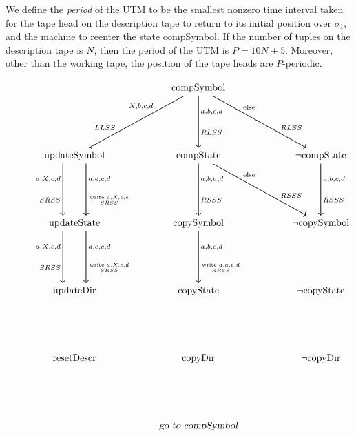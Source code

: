 \documentclass[english,letter paper,12pt,reqno]{article}
\theoremstyle{definition}
\begin{document}
We define the \textit{period} of the UTM to be the smallest nonzero time interval taken for the tape head on the description tape to return to its initial position over $\sigma_1$, and the machine to reenter the state compSymbol. If the number of tuples on the description tape is $N$, then the period of the UTM is $P = 10N+5$. Moreover, other than the working tape, the position of the tape heads are $P$-periodic.

\begin{figure}[htpb]
    \centering
\[
\begin{tikzcd}[row sep = large]
	&& {\text{compSymbol}} \\
	\\
	{\text{updateSymbol}} && {\text{compState}} && {\neg \text{compState}} \\
	\\
	{\text{updateState}} && {\text{copySymbol}} && {\neg\text{copySymbol}} \\
	\\
	{\text{updateDir}} && {\text{copyState}} && {\neg\text{copyState}} \\
	\\
	{\text{resetDescr}} && {\text{copyDir}} && {\neg\text{copyDir}} \\
	\\
	&& {\textsl{go to compSymbol}}
	\arrow["{X,b,c,d}"'{pos=0.3}, from=1-3, to=3-1]
	\arrow["LLSS"'{pos=0.7}, from=1-3, to=3-1]
	\arrow["{a,b,c,a}"{pos=0.3}, from=1-3, to=3-3]
	\arrow["RLSS"{pos=0.7}, from=1-3, to=3-3]
	\arrow["{\text{else}}"{pos=0.3}, from=1-3, to=3-5]
	\arrow["RLSS"{pos=0.7}, from=1-3, to=3-5]
	\arrow["{a,X,c,d}"'{pos=0.3}, shift right=5, from=3-1, to=5-1]
	\arrow["SRSS"'{pos=0.7}, shift right=5, from=3-1, to=5-1]
	\arrow["{a,e,c,d}"{pos=0.3}, shift left=5, from=3-1, to=5-1]
	\arrow["{\genfrac{}{}{0pt}{}{\text{write }a,X,c,e}{SRSS}}"{pos=0.7}, shift left=5, from=3-1, to=5-1]
	\arrow["{a,b,a,d}"{pos=0.3}, from=3-3, to=5-3]
	\arrow["RSSS"{pos=0.7}, from=3-3, to=5-3]
	\arrow["{\text{else}}"{pos=0.3}, from=3-3, to=5-5]
	\arrow["RSSS"{pos=0.7}, from=3-3, to=5-5]
	\arrow["{a,b,c,d}"{pos=0.3}, from=3-5, to=5-5]
	\arrow["RSSS"{pos=0.7}, from=3-5, to=5-5]
	\arrow["{a,X,c,d}"'{pos=0.3}, shift right=5, from=5-1, to=7-1]
	\arrow["SRSS"'{pos=0.7}, shift right=5, from=5-1, to=7-1]
	\arrow["{a,e,c,d}"{pos=0.3}, shift left=5, from=5-1, to=7-1]
	\arrow["{\genfrac{}{}{0pt}{}{\text{write }a,X,e,d}{SRSS}}"{pos=0.7}, shift left=5, from=5-1, to=7-1]
	\arrow["{a,b,c,d}"{pos=0.3}, from=5-3, to=7-3]
	\arrow["{\genfrac{}{}{0pt}{}{\text{write }a,a,c,d}{RRSS}}"{pos=0.7}, from=5-3, to=7-3]

\end{tikzcd}\]
\end{figure}
\end{document}
